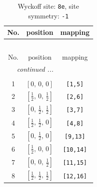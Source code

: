 \documentclass[fleqn,8pt]{jsarticle}
\begin{document}
\renewcommand{\arraystretch}{1.2}
\begin{longtable}{ccc}
\caption{Wyckoff site: {\tt 8e}, site symmetry: {\tt -1}}
 \\
 \hline \hline
No. & position & mapping \\ \hline \endfirsthead

\multicolumn{2}{l}{\tablename\ \thetable{}} \\
 \hline \hline
No. & position & mapping \\ \hline \endhead

 \hline \hline
\multicolumn{2}{r}{\footnotesize\it continued ...} \\ \endfoot

 \hline \hline
\multicolumn{2}{r}{} \\ \endlastfoot

1 & $\left[ 0,\, 0,\, 0 \right]$ & {\tt [1,5]} \\ \hline
2 & $\left[ \frac{1}{2},\, 0,\, \frac{1}{2} \right]$ & {\tt [2,6]} \\ \hline
3 & $\left[ 0,\, \frac{1}{2},\, \frac{1}{2} \right]$ & {\tt [3,7]} \\ \hline
4 & $\left[ \frac{1}{2},\, \frac{1}{2},\, 0 \right]$ & {\tt [4,8]} \\ \hline
5 & $\left[ 0,\, \frac{1}{2},\, 0 \right]$ & {\tt [9,13]} \\ \hline
6 & $\left[ \frac{1}{2},\, 0,\, 0 \right]$ & {\tt [10,14]} \\ \hline
7 & $\left[ 0,\, 0,\, \frac{1}{2} \right]$ & {\tt [11,15]} \\ \hline
8 & $\left[ \frac{1}{2},\, \frac{1}{2},\, \frac{1}{2} \right]$ & {\tt [12,16]} \\
\end{longtable}
\renewcommand{\arraystretch}{1.2}
\end{document}
